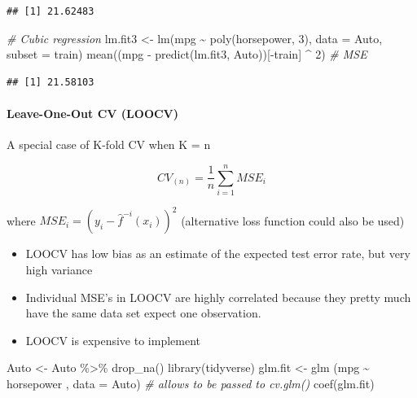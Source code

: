\documentclass[
]{book}
\newenvironment{Shaded}{\begin{snugshade}}{\end{snugshade}}
\newcommand{\AttributeTok}[1]{\textcolor[rgb]{0.77,0.63,0.00}{#1}}
\newcommand{\CommentTok}[1]{\textcolor[rgb]{0.56,0.35,0.01}{\textit{#1}}}
\newcommand{\DecValTok}[1]{\textcolor[rgb]{0.00,0.00,0.81}{#1}}
\newcommand{\FunctionTok}[1]{\textcolor[rgb]{0.00,0.00,0.00}{#1}}
\newcommand{\NormalTok}[1]{#1}
\newcommand{\OtherTok}[1]{\textcolor[rgb]{0.56,0.35,0.01}{#1}}
\newcommand{\SpecialCharTok}[1]{\textcolor[rgb]{0.00,0.00,0.00}{#1}}
\begin{document}
\begin{verbatim}
## [1] 21.62483
\end{verbatim}

\begin{Shaded}
\begin{Highlighting}[]
\CommentTok{\# Cubic regression}
\NormalTok{lm.fit3 }\OtherTok{\textless{}{-}} \FunctionTok{lm}\NormalTok{(mpg }\SpecialCharTok{\textasciitilde{}} \FunctionTok{poly}\NormalTok{(horsepower, }\DecValTok{3}\NormalTok{), }\AttributeTok{data =}\NormalTok{ Auto, }\AttributeTok{subset =}\NormalTok{ train)}
\FunctionTok{mean}\NormalTok{((mpg }\SpecialCharTok{{-}} \FunctionTok{predict}\NormalTok{(lm.fit3, Auto))[}\SpecialCharTok{{-}}\NormalTok{train] }\SpecialCharTok{\^{}} \DecValTok{2}\NormalTok{) }\CommentTok{\# MSE}
\end{Highlighting}
\end{Shaded}

\begin{verbatim}
## [1] 21.58103
\end{verbatim}

\hypertarget{leave-one-out-cv-loocv}{%
\paragraph{Leave-One-Out CV (LOOCV)}\label{leave-one-out-cv-loocv}}

A special case of K-fold CV when K = n

\[
CV_{(n)} = \frac{1}{n} \sum_{i=1}^n MSE_i
\]

where \(MSE_i = (y_i - \hat{f}^{-i}(x_i))^2\) (alternative loss function could also be used)

\begin{itemize}
\item
  LOOCV has low bias as an estimate of the expected test error rate, but very high variance
\item
  Individual MSE's in LOOCV are highly correlated because they pretty much have the same data set expect one observation.
\item
  LOOCV is expensive to implement
\end{itemize}

\begin{Shaded}
\begin{Highlighting}[]
\NormalTok{Auto }\OtherTok{\textless{}{-}}\NormalTok{ Auto }\SpecialCharTok{\%\textgreater{}\%} \FunctionTok{drop\_na}\NormalTok{()}
\FunctionTok{library}\NormalTok{(tidyverse)}
\NormalTok{glm.fit }\OtherTok{\textless{}{-}} \FunctionTok{glm}\NormalTok{ (mpg }\SpecialCharTok{\textasciitilde{}}\NormalTok{ horsepower , }\AttributeTok{data =}\NormalTok{ Auto) }\CommentTok{\# allows to be passed to cv.glm()}
\FunctionTok{coef}\NormalTok{(glm.fit)}
\end{Highlighting}
\end{Shaded}
\end{document}
